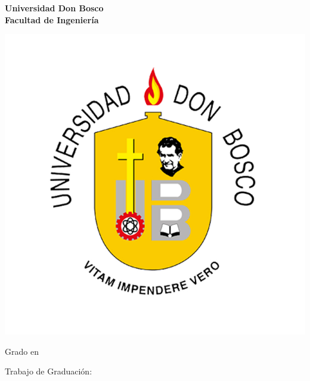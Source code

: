 \begin{titlepage}
    \begin{center}
            \LARGE{\textbf{ Universidad Don Bosco }}\\
            \Large{\textbf{ Facultad de Ingeniería }}
    \end{center}

    \begin{center}
         \includegraphics[scale=0.75]{document/include/Universidad_don_bosco.jpg}
    \end{center}
   
    \begin{center}
        \Large{Grado en  \Grado{} }
    \end{center}
    
    \vspace*{0.3cm}
    
    \begin{center}
        \huge{Trabajo de Graduación:}
    \end{center}
    
    \vspace*{0.3cm}
    

\end{titlepage}
